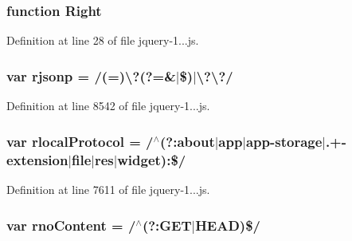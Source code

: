 \subsubsection[{\texorpdfstring{Right}{Right}}]{\setlength{\rightskip}{0pt plus 5cm}function Right}\hypertarget{_scripts_2jquery-1_810_82_8js_ac7f66efc33d974809d85fc5bdb00c6eb}{}\label{_scripts_2jquery-1_810_82_8js_ac7f66efc33d974809d85fc5bdb00c6eb}


Definition at line 28 of file jquery-\/1...\+js.

\subsubsection[{\texorpdfstring{rjsonp}{rjsonp}}]{\setlength{\rightskip}{0pt plus 5cm}var rjsonp = /(=)\textbackslash{}?(?=\&$\vert$\$)$\vert$\textbackslash{}?\textbackslash{}?/}\hypertarget{_scripts_2jquery-1_810_82_8js_a8b62e46075611fd1fc0bbb78b14d113a}{}\label{_scripts_2jquery-1_810_82_8js_a8b62e46075611fd1fc0bbb78b14d113a}


Definition at line 8542 of file jquery-\/1...\+js.

\subsubsection[{\texorpdfstring{rlocal\+Protocol}{rlocalProtocol}}]{\setlength{\rightskip}{0pt plus 5cm}var rlocal\+Protocol = /$^\wedge$(?\+:about$\vert$app$\vert$app-\/storage$\vert$.+-\/extension$\vert$file$\vert$res$\vert$widget)\+:\$/}\hypertarget{_scripts_2jquery-1_810_82_8js_af4dd13c90298bbf53ce08ec707dc9e2a}{}\label{_scripts_2jquery-1_810_82_8js_af4dd13c90298bbf53ce08ec707dc9e2a}


Definition at line 7611 of file jquery-\/1...\+js.

\subsubsection[{\texorpdfstring{rno\+Content}{rnoContent}}]{\setlength{\rightskip}{0pt plus 5cm}var rno\+Content = /$^\wedge$(?\+:G\+ET$\vert$H\+E\+AD)\$/}\hypertarget{_scripts_2jquery-1_810_82_8js_a537d744d72e31ec312aa3f16ef576d3f}{}\label{_scripts_2jquery-1_810_82_8js_a537d744d72e31ec312aa3f16ef576d3f}


